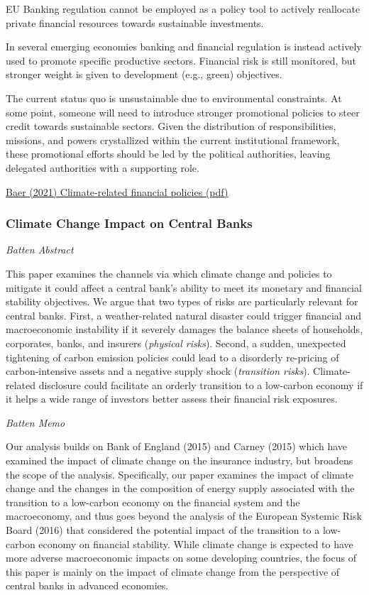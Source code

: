 \documentclass[
]{book}
\begin{document}
EU Banking regulation cannot be employed as a
policy tool to actively reallocate private financial resources towards sustainable investments.

In several emerging economies banking and financial regulation is instead
actively used to promote specific productive sectors.
Financial risk is still monitored, but stronger
weight is given to development (e.g., green) objectives.

The current status quo is unsustainable due to environmental constraints. At some
point, someone will need to introduce stronger promotional policies to steer credit towards
sustainable sectors. Given the distribution of responsibilities, missions, and powers crystallized
within the current institutional framework, these promotional efforts should be led by the
political authorities, leaving delegated authorities with a supporting role.

\href{pdf/Baer_2021_Institutional_Climate_Policy_Dynamics.pdf}{Baer (2021) Climate-related financial policies (pdf)}

\hypertarget{climate-change-impact-on-central-banks}{%
\subsubsection{Climate Change Impact on Central Banks}\label{climate-change-impact-on-central-banks}}

\emph{Batten Abstract}

This paper examines the channels via which climate change and policies to mitigate it could affect a
central bank's ability to meet its monetary and financial stability objectives. We argue that two types of
risks are particularly relevant for central banks. First, a weather-related natural disaster could trigger
financial and macroeconomic instability if it severely damages the balance sheets of households,
corporates, banks, and insurers (\emph{physical risks}). Second, a sudden, unexpected tightening of carbon
emission policies could lead to a disorderly re-pricing of carbon-intensive assets and a negative supply
shock (\emph{transition risks}). Climate-related disclosure could facilitate an orderly transition to a low-carbon
economy if it helps a wide range of investors better assess their financial risk exposures.

\emph{Batten Memo}

Our analysis builds on Bank of England (2015) and
Carney (2015) which have examined the impact of climate change on the insurance industry, but
broadens the scope of the analysis. Specifically, our paper examines the impact of climate
change and the changes in the composition of energy supply associated with the transition to a
low-carbon economy on the financial system and the macroeconomy, and thus goes beyond the
analysis of the European Systemic Risk Board (2016) that considered the potential impact of the
transition to a low-carbon economy on financial stability. While climate change is expected to
have more adverse macroeconomic impacts on some developing countries, the focus of this
paper is mainly on the impact of climate change from the perspective of central banks in
advanced economies.
\end{document}

